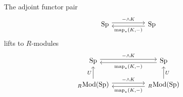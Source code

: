 \begin{remark}
The adjoint functor pair
\[
\begin{tikzcd}
\Sp \arrow[rr, "- \smsh K", shift left] &  &\Sp \arrow[ll, "{\map_*(K,-)}", shift left]
\end{tikzcd}
\]
lifts to $R$-modules 
\[
\begin{tikzcd}
\Sp \arrow[rr, "- \smsh K", shift left] &  &\Sp \arrow[ll, "{\map_*(K,-)}", shift left]\\
{}_{R\!}\Mod(\Sp) \arrow[rr, "- \smsh K", shift left] \arrow[u, "U"] &  & {}_{R\!}\Mod(\Sp) \arrow[ll, "{\map_*(K,-)}", shift left] \arrow[u, "U", swap]
\end{tikzcd}
\]
\end{remark}
